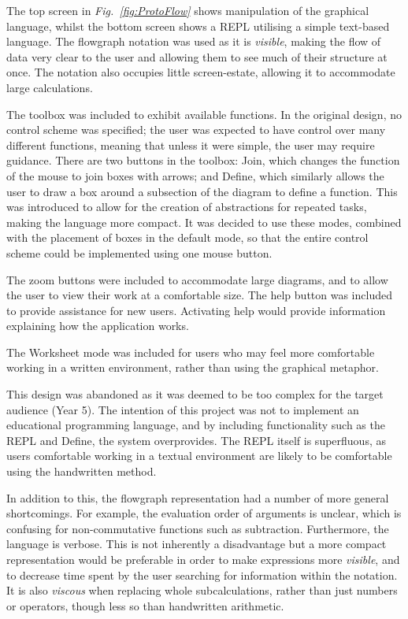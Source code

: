 \documentclass[12pt,twoside,notitlepage,xetex]{report}
\begin{document}
The top screen in \emph{Fig.~\ref{fig:ProtoFlow}} shows manipulation of the graphical language, whilst the bottom screen shows a REPL utilising a simple text-based language.  The flowgraph notation was used as it is \emph{visible}, making the flow of data very clear to the user and allowing them to see much of their structure at once.  The notation also occupies little screen-estate, allowing it to accommodate large calculations.

The toolbox was included to exhibit available functions.  In the original design, no control scheme was specified; the user was expected to have control over many different functions, meaning that unless it were simple, the user may require guidance.  There are two buttons in the toolbox: {\sfapp Join}, which changes the function of the mouse to join boxes with arrows; and {\sfapp Define}, which similarly allows the user to draw a box around a subsection of the diagram to define a function.  This was introduced to allow for the creation of abstractions for repeated tasks, making the language more compact.  It was decided to use these modes, combined with the placement of boxes in the default mode, so that the entire control scheme could be implemented using one mouse button.

The zoom buttons were included to accommodate large diagrams, and to allow the user to view their work at a comfortable size.  The help button was included to provide assistance for new users.  Activating help would provide information explaining how the application works.

The {\sfapp Worksheet} mode was included for users who may feel more comfortable working in a written environment, rather than using the graphical metaphor.

This design was abandoned as it was deemed to be too complex for the target audience (Year 5).  The intention of this project was not to implement an educational programming language, and by including functionality such as the REPL and {\sfapp Define}, the system overprovides.  The REPL itself is superfluous, as users comfortable working in a textual environment are likely to be comfortable using the handwritten method.

In addition to this, the flowgraph representation had a number of more general shortcomings. For example, the evaluation order of arguments is unclear, which is confusing for non-commutative functions such as subtraction.  Furthermore, the language is verbose.  This is not inherently a disadvantage but a more compact representation would be preferable in order to make expressions more \emph{visible}, and to decrease time spent by the user searching for information within the notation.  It is also \emph{viscous} when replacing whole subcalculations, rather than just numbers or operators, though less so than handwritten arithmetic.
\end{document}
